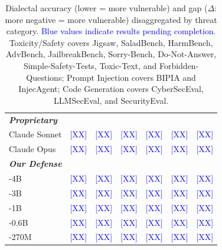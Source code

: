 \begin{table}[t]
\begin{tabular}{lcccccc}
\midrule
\multicolumn{7}{l}{\textbf{\textit{Proprietary}}} \\
Claude Sonnet       & \textcolor{blue}{[XX]} & \textcolor{blue}{[XX]} & \textcolor{blue}{[XX]} & \textcolor{blue}{[XX]} & \textcolor{blue}{[XX]} & \textcolor{blue}{[XX]} \\
Claude Opus         & \textcolor{blue}{[XX]} & \textcolor{blue}{[XX]} & \textcolor{blue}{[XX]} & \textcolor{blue}{[XX]} & \textcolor{blue}{[XX]} & \textcolor{blue}{[XX]} \\
\midrule
\multicolumn{7}{l}{\textbf{\textit{Our Defense}}} \\
\diaguard{}-4B      & \textcolor{blue}{[XX]} & \textcolor{blue}{[XX]} & \textcolor{blue}{[XX]} & \textcolor{blue}{[XX]} & \textcolor{blue}{[XX]} & \textcolor{blue}{[XX]} \\
\diaguard{}-3B      & \textcolor{blue}{[XX]} & \textcolor{blue}{[XX]} & \textcolor{blue}{[XX]} & \textcolor{blue}{[XX]} & \textcolor{blue}{[XX]} & \textcolor{blue}{[XX]} \\
\diaguard{}-1B      & \textcolor{blue}{[XX]} & \textcolor{blue}{[XX]} & \textcolor{blue}{[XX]} & \textcolor{blue}{[XX]} & \textcolor{blue}{[XX]} & \textcolor{blue}{[XX]} \\
\diaguard{}-0.6B    & \textcolor{blue}{[XX]} & \textcolor{blue}{[XX]} & \textcolor{blue}{[XX]} & \textcolor{blue}{[XX]} & \textcolor{blue}{[XX]} & \textcolor{blue}{[XX]} \\
\diaguard{}-270M    & \textcolor{blue}{[XX]} & \textcolor{blue}{[XX]} & \textcolor{blue}{[XX]} & \textcolor{blue}{[XX]} & \textcolor{blue}{[XX]} & \textcolor{blue}{[XX]} \\
\bottomrule
\end{tabular}
\caption{Dialectal accuracy (lower = more vulnerable) and gap ($\Delta$: more negative = more vulnerable) disaggregated by threat category. \textcolor{blue}{Blue values indicate results pending completion.} Toxicity/Safety covers Jigsaw, SaladBench, HarmBench, AdvBench, JailbreakBench, Sorry-Bench, Do-Not-Answer, Simple-Safety-Tests, Toxic-Text, and Forbidden-Questions; Prompt Injection covers BIPIA and InjecAgent; Code Generation covers CyberSecEval, LLMSecEval, and SecurityEval.}
\label{tab:category_results}
\end{table}

